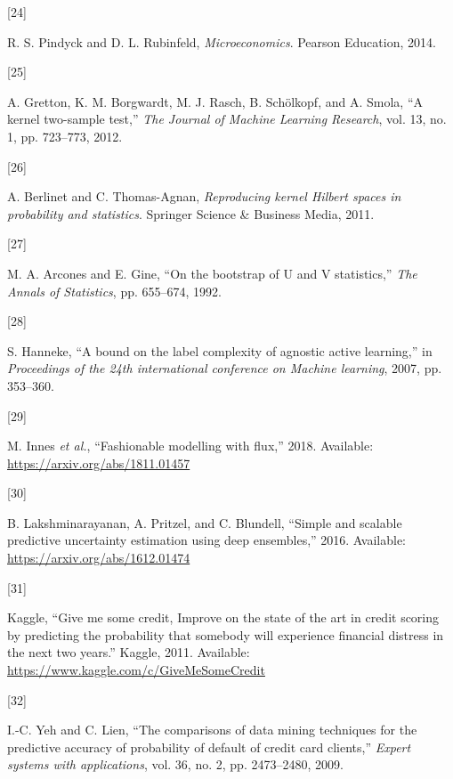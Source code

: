 \documentclass[conference,final,]{IEEEtran}
\newlength{\cslhangindent}
\newlength{\csllabelwidth}
\newlength{\cslentryspacingunit} %
\newenvironment{CSLReferences}[2] %
 {%
  \setlength{\parindent}{0pt}
  \ifodd #1
  \let\oldpar\par
  \def\par{\hangindent=\cslhangindent\oldpar}
  \fi
  \setlength{\parskip}{#2\cslentryspacingunit}
 }%
 {}
\newcommand{\CSLLeftMargin}[1]{\parbox[t]{\csllabelwidth}{#1}}
\newcommand{\CSLRightInline}[1]{\parbox[t]{\linewidth - \csllabelwidth}{#1}\break}
\theoremstyle{definition}
\theoremstyle{definition}
\theoremstyle{definition}
\theoremstyle{definition}
\theoremstyle{remark}
\begin{document}
\begin{CSLReferences}{0}{0}
\leavevmode{}%
\CSLLeftMargin{{[}24{]} }%
\CSLRightInline{R. S. Pindyck and D. L. Rubinfeld, \emph{Microeconomics}. {Pearson Education}, 2014.}

\leavevmode{}%
\CSLLeftMargin{{[}25{]} }%
\CSLRightInline{A. Gretton, K. M. Borgwardt, M. J. Rasch, B. Schölkopf, and A. Smola, {``A kernel two-sample test,''} \emph{The Journal of Machine Learning Research}, vol. 13, no. 1, pp. 723--773, 2012.}

\leavevmode{}%
\CSLLeftMargin{{[}26{]} }%
\CSLRightInline{A. Berlinet and C. Thomas-Agnan, \emph{Reproducing kernel {Hilbert} spaces in probability and statistics}. {Springer Science \& Business Media}, 2011.}

\leavevmode{}%
\CSLLeftMargin{{[}27{]} }%
\CSLRightInline{M. A. Arcones and E. Gine, {``On the bootstrap of {U} and {V} statistics,''} \emph{The Annals of Statistics}, pp. 655--674, 1992.}

\leavevmode{}%
\CSLLeftMargin{{[}28{]} }%
\CSLRightInline{S. Hanneke, {``A bound on the label complexity of agnostic active learning,''} in \emph{Proceedings of the 24th international conference on {Machine} learning}, 2007, pp. 353--360.}

\leavevmode{}%
\CSLLeftMargin{{[}29{]} }%
\CSLRightInline{M. Innes \emph{et al.}, {``Fashionable modelling with flux,''} 2018. Available: \url{https://arxiv.org/abs/1811.01457}}

\leavevmode{}%
\CSLLeftMargin{{[}30{]} }%
\CSLRightInline{B. Lakshminarayanan, A. Pritzel, and C. Blundell, {``Simple and scalable predictive uncertainty estimation using deep ensembles,''} 2016. Available: \url{https://arxiv.org/abs/1612.01474}}

\leavevmode{}%
\CSLLeftMargin{{[}31{]} }%
\CSLRightInline{Kaggle, {``Give me some credit, {Improve} on the state of the art in credit scoring by predicting the probability that somebody will experience financial distress in the next two years.''} {Kaggle}, 2011. Available: \url{https://www.kaggle.com/c/GiveMeSomeCredit}}

\leavevmode{}%
\CSLLeftMargin{{[}32{]} }%
\CSLRightInline{I.-C. Yeh and C. Lien, {``The comparisons of data mining techniques for the predictive accuracy of probability of default of credit card clients,''} \emph{Expert systems with applications}, vol. 36, no. 2, pp. 2473--2480, 2009.}


\end{CSLReferences}
\end{document}
